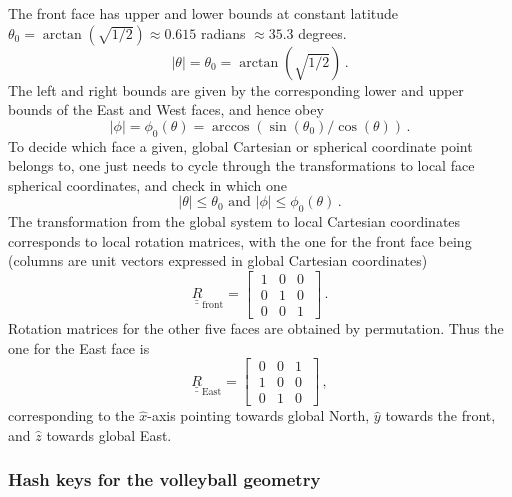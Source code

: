 \documentclass[paper=a4,fontsize=11pt]{scrartcl}
\numberwithin{equation}{section}		%
\numberwithin{figure}{section}			%
\numberwithin{table}{section}				%
\begin{document}
The front face has upper and lower bounds at constant latitude $\theta_0=\arctan(\sqrt{1/2})\approx 0.615$ radians $\approx 35.3$ degrees.  \begin{equation}
    |\theta| = \theta_0 = \arctan(\sqrt{1/2}) \,.
\end{equation}
The left and right bounds are given by the corresponding lower and upper bounds of the East and West faces, and hence obey
\begin{equation}\label{eq:bounds}
    |\phi|=\phi_0 (\theta) = \arccos(\sin(\theta_0)/\cos(\theta)) \,.
\end{equation}
To decide which face a given, global Cartesian or spherical coordinate point belongs to, one just needs to cycle through the transformations to local face spherical coordinates, and check in which one
\begin{equation}
    |\theta| \leq \theta_0 \mbox{ and } |\phi| \leq \phi_0(\theta)\,.
\end{equation}
The transformation from the global system to local Cartesian coordinates corresponds to local rotation matrices, with the one for the front face being (columns are unit vectors expressed in global Cartesian coordinates)
\def\rot{\underline{\underline{R}}}
\begin{equation}
\rot_\mathrm{front} = 
\begin{bmatrix}
\ 1 & 0 & 0 \ \\
\ 0 & 1 & 0 \ \\
\ 0 & 0 & 1 \
\end{bmatrix} \,.
\end{equation}
Rotation matrices for the other five faces are obtained by permutation.  Thus the one for the East face is
\begin{equation}
\rot_\mathrm{East} = 
\begin{bmatrix}
\ 0 & 0 & 1 \ \\
\ 1 & 0 & 0 \ \\
\ 0 & 1 & 0 \
\end{bmatrix} \,,
\end{equation}
corresponding to the $\hat{x}$-axis pointing towards global North, $\hat{y}$ towards the front, and $\hat{z}$ towards global East.


\subsubsection{Hash keys for the volleyball geometry}
\end{document}
